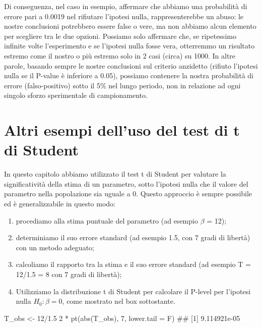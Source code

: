 \documentclass[a4paper,12pt,oneside]{book}
\providecommand{\tightlist}{%
  \setlength{\itemsep}{0pt}\setlength{\parskip}{0pt}}
\newenvironment{Shaded}{\begin{snugshade}}{\end{snugshade}}
\newcommand{\DecValTok}[1]{#1}
\newcommand{\FloatTok}[1]{#1}
\newcommand{\SpecialCharTok}[1]{#1}
\newcommand{\DocumentationTok}[1]{#1}
\newcommand{\OtherTok}[1]{#1}
\newcommand{\FunctionTok}[1]{#1}
\newcommand{\AttributeTok}[1]{#1}
\newcommand{\NormalTok}[1]{#1}
\begin{document}
Di conseguenza, nel caso in esempio, affermare che abbiamo una probabilità di errore pari a 0.0019 nel rifiutare l'ipotesi nulla, rappresenterebbe un abuso: le nostre conclusioni potrebbero essere false o vere, ma non abbiamo alcun elemento per scegliere tra le due opzioni. Possiamo solo affermare che, se ripetessimo infinite volte l'esperimento e se l'ipotesi nulla fosse vera, otterremmo un risultato estremo come il nostro o più estremo solo in 2 casi (circa) su 1000. In altre parole, basando sempre le nostre conclusioni sul criterio anzidetto (rifiuto l'ipotesi nulla se il P-value è inferiore a 0.05), possiamo contenere la nostra probabilità di errore (falso-positivo) sotto il 5\% nel lungo periodo, non in relazione ad ogni singolo sforzo sperimentale di campionamento.

\hypertarget{altri-esempi-delluso-del-test-di-t-di-student}{%
\section{Altri esempi dell'uso del test di t di Student}\label{altri-esempi-delluso-del-test-di-t-di-student}}

In questo capitolo abbiamo utilizzato il test t di Student per valutare la significatività della stima di un parametro, sotto l'ipotesi nulla che il valore del parametro nella popolazione sia uguale a 0. Questo approccio è sempre possibile ed è generalizzabile in questo modo:

\begin{enumerate}
\def\labelenumi{\arabic{enumi}.}
\tightlist
\item
  procediamo alla stima puntuale del parametro (ad esempio \(\beta\) = 12);
\item
  determiniamo il suo errore standard (ad esempio 1.5, con 7 gradi di libertà) con un metodo adeguato;
\item
  calcoliamo il rapporto tra la stima e il suo errore standard (ad esempio T = 12/1.5 = 8 con 7 gradi di libertà);
\item
  Utilizziamo la distribuzione t di Student per calcolare il P-level per l'ipotesi nulla \(H_0: \beta = 0\), come mostrato nel box sottostante.
\end{enumerate}

\begin{Shaded}
\begin{Highlighting}[]
\NormalTok{T\_obs }\OtherTok{\textless{}{-}} \DecValTok{12}\SpecialCharTok{/}\FloatTok{1.5}
\DecValTok{2} \SpecialCharTok{*} \FunctionTok{pt}\NormalTok{(}\FunctionTok{abs}\NormalTok{(T\_obs), }\DecValTok{7}\NormalTok{, }\AttributeTok{lower.tail =}\NormalTok{ F)}
\DocumentationTok{\#\# [1] 9.114921e{-}05}
\end{Highlighting}
\end{Shaded}
\end{document}
